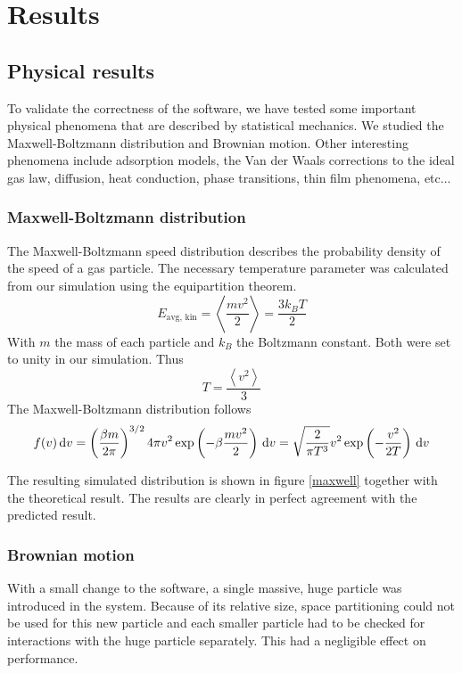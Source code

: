 \section{Results}
\subsection{Physical results}

To validate the correctness of the software, we have tested some important 
physical phenomena that are described by statistical mechanics. We studied the 
Maxwell-Boltzmann distribution and Brownian motion. Other interesting phenomena 
include adsorption models, the Van der Waals corrections to the ideal gas law, 
diffusion, heat conduction, phase transitions, thin film phenomena, etc...

\subsubsection{Maxwell-Boltzmann distribution}
The Maxwell-Boltzmann speed distribution describes the probability density of 
the speed of a gas particle. The necessary temperature parameter was calculated 
from our simulation using the equipartition theorem.
$$
E_{\textrm{avg, kin}} = \left< \frac{mv^2}{2} \right> = \frac{3k_BT}{2}
$$
With $m$ the mass of each particle and $k_B$ the Boltzmann constant. Both were 
set to unity in our simulation. Thus
$$
T = \frac{\left< v^2 \right>}{3}
$$
The Maxwell-Boltzmann distribution follows
$$
f(v)\,\mathrm d v = \left( \frac{\beta m}{2 \pi} \right)^{3/2} 4 \pi v^2
\exp\left( -\beta \frac{mv^2}{2}\right) \,\mathrm d v =
\sqrt{ \frac{2}{\pi T^3} } v^2 \exp \left(-\frac{v^2}{2T}\right) \,\mathrm d v
$$

The resulting simulated distribution is shown in figure \ref{maxwell} together 
with the theoretical result. The results are clearly in perfect agreement with 
the predicted result.

\subsubsection{Brownian motion}
With a small change to the software, a single massive, huge particle was 
introduced in the system. Because of its relative size, space partitioning 
could not be used for this new particle and each smaller particle had to be 
checked for interactions with the huge particle separately. This had a 
negligible effect on performance.


